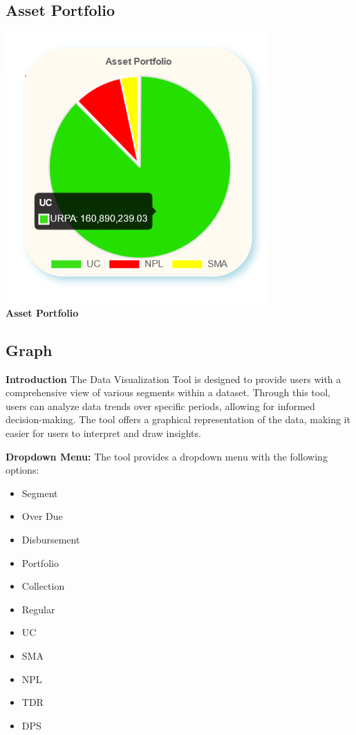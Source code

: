\documentclass{article}
\begin{document}
\subsection{Asset Portfolio}
\begin{center}
\includegraphics[width=.75\textwidth]{image/ro_5_portfilo_asset.png}\\
\textbf {Asset Portfolio}
\end{center}

\subsection{Graph}
\textbf{Introduction}
The Data Visualization Tool is designed to provide users with a comprehensive view of various segments within a dataset. Through this tool, users can analyze data trends over specific periods, allowing for informed decision-making. The tool offers a graphical representation of the data, making it easier for users to interpret and draw insights.

\textbf{Dropdown Menu:}
The tool provides a dropdown menu with the following options:
\begin{itemize}
    \item Segment
    \item Over Due
    \item Disbursement
    \item Portfolio
    \item Collection
    \item Regular
    \item UC
    \item SMA
    \item NPL
    \item TDR
    \item DPS
\end{itemize}
\end{document}
